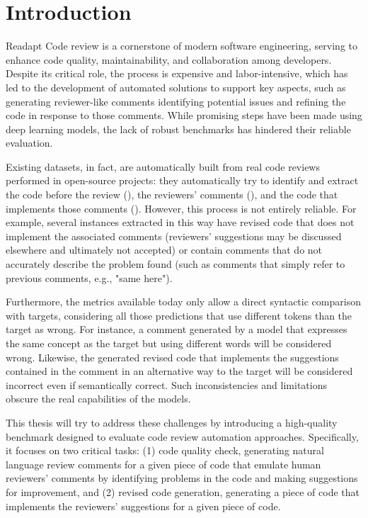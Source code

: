 \section{Introduction}
{\color{red} Readapt}
Code review is a cornerstone of modern software engineering, serving to enhance
code quality, maintainability, and collaboration among developers. Despite its critical
role, the process is expensive and labor-intensive, which has led to the development
of automated solutions to support key aspects, such as generating reviewer-like
comments identifying potential issues and refining the code in response to those comments.
While promising steps have been made using deep learning models, the lack of robust
benchmarks has hindered their reliable evaluation.

Existing datasets, in fact, are automatically built from real code reviews
performed in open-source projects: they automatically try to identify and
extract the code before the review (\subCode), the reviewers' comments
(\revComment), and the code that implements those comments (\revCode). However,
this process is not entirely reliable. For example, several instances extracted
in this way have revised code that does not implement the associated comments
(reviewers' suggestions may be discussed elsewhere and ultimately not accepted)
or contain comments that do not accurately describe the problem found (such as
comments that simply refer to previous comments, e.g., "same here").

Furthermore, the metrics available today only allow a direct syntactic comparison with targets,
considering all those predictions that use different tokens than the target as wrong. For instance,
a comment generated by a model that expresses the same concept as the target but using
different words will be considered wrong. Likewise, the generated revised code that implements
the suggestions contained in the comment in an alternative way to the target will be considered
incorrect even if semantically correct.
Such inconsistencies and limitations obscure the real capabilities of the models.


This thesis will try to address these challenges by introducing a high-quality
benchmark designed to evaluate code review automation approaches.
Specifically, it focuses on two critical tasks: (1) code quality check, \ie
generating natural language review comments for a given piece of code that emulate
human reviewers' comments by identifying problems in the code and making suggestions
for improvement, and (2) revised code generation, \ie generating a piece of code that
implements the reviewers' suggestions for a given piece of code.

